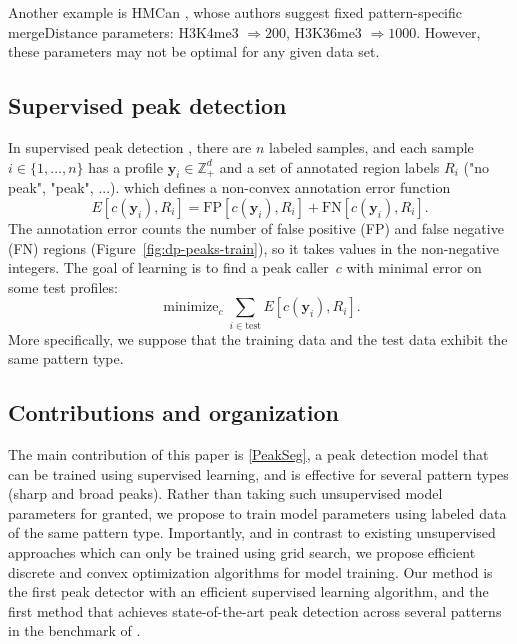 \documentclass{article}
\DeclareMathOperator*{\minimize}{minimize}
\newcommand{\ZZ}{\mathbb Z}
\begin{document}
Another example is HMCan \citep{HMCan}, whose authors suggest fixed
pattern-specific mergeDistance parameters: H3K4me3 $\Rightarrow 200$,
H3K36me3 $\Rightarrow 1000$. However, these parameters may not be
optimal for any given data set.

\subsection{Supervised peak detection}

In supervised peak detection \citep{hocking2014visual}, there
are $n$ labeled samples, and each sample $i\in\{1, \dots, n\}$ has a
profile $\mathbf y_i\in\ZZ_+^d$ and a set of annotated region labels $R_i$ 
("no peak", "peak", ...).
which defines a non-convex annotation error function
\begin{equation}
  \label{eq:error}
  E[c(\mathbf y_i),  R_i] =
  \text{FP}[c(\mathbf y_i), R_i] +
  \text{FN}[c(\mathbf y_i), R_i].
\end{equation}
The annotation error counts the number of false positive (FP) and
false negative (FN) regions (Figure~\ref{fig:dp-peaks-train}), so it
takes values in the non-negative integers. The goal of learning is to
find a peak caller~$c$ with minimal error on some test profiles:
\begin{equation}
  \label{eq:min_error}
  \minimize_c \sum_{i\in\text{test}} E[c(\mathbf y_i),  R_i].
\end{equation}
More specifically, we suppose that the training data and the test data
exhibit the same pattern type.


\subsection{Contributions and organization}

The main contribution of this paper is \ref{PeakSeg}, a peak detection
model that can be trained using supervised learning, and is effective
for several pattern types (sharp and broad peaks). Rather than taking such unsupervised model
parameters for granted, we propose to train model parameters using
labeled data of the same pattern type. Importantly, and in contrast to
existing unsupervised approaches which can only be trained using grid
search, we propose efficient discrete and convex optimization
algorithms for model training. Our method is the first peak detector
with an efficient supervised learning algorithm, and the first method
that achieves state-of-the-art peak detection across several 
patterns in the benchmark of \citet{hocking2014visual}.
\end{document}
